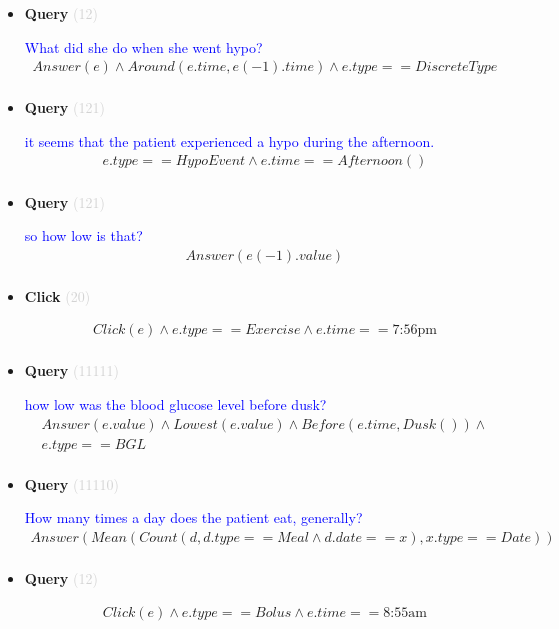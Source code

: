 \documentclass[11pt]{article}
\newcommand{\key}[1]{\textcolor{lightgray}{#1}}
\newcounter{CQuery}
\newcounter{CClick}
\begin{document}
\begin{itemize}
\item
\textbf{Query\theCQuery} \key{(12)} \addtocounter{CQuery}{1}
\textcolor{blue}{ What did she do when she went hypo? }
\begin{multline*}
Answer(e) \wedge Around(e.time, e(-1).time) \wedge e.type==DiscreteType \\ 
\end{multline*}


\item
\textbf{Query\theCQuery} \key{(121)} \addtocounter{CQuery}{1}
\textcolor{blue}{ it seems that the patient experienced a hypo during the afternoon. }
\begin{multline*}
e.type==HypoEvent \wedge e.time==Afternoon() \\ 
\end{multline*}


\item
\textbf{Query\theCQuery} \key{(121)} \addtocounter{CQuery}{1}
\textcolor{blue}{ so how low is that? }
\begin{multline*}
Answer(e(-1).value) \\ 
\end{multline*}


\item
\textbf{Click\theCClick} \key{(20)} \addtocounter{CClick}{1}
\textcolor{blue}{  }
\begin{multline*}
Click(e) \wedge e.type==Exercise \wedge e.time==\mbox{7:56pm} \\ 
\end{multline*}


\item
\textbf{Query\theCQuery} \key{(11111)} \addtocounter{CQuery}{1}
\textcolor{blue}{ how low was the blood glucose level before dusk? }
\begin{multline*}
Answer(e.value) \wedge Lowest(e.value) \wedge Before(e.time, Dusk()) \wedge \\ 
e.type==BGL \\ 
\end{multline*}


\item
\textbf{Query\theCQuery} \key{(11110)} \addtocounter{CQuery}{1}
\textcolor{blue}{ How many times a day does the patient eat, generally? }
\begin{multline*}
Answer(Mean(Count(d, d.type==Meal \wedge d.date==x), x.type==Date)) \\ 
\end{multline*}


\item
\textbf{Query\theCQuery} \key{(12)} \addtocounter{CQuery}{1}
\textcolor{blue}{  }
\begin{multline*}
Click(e) \wedge e.type == Bolus \wedge e.time==\mbox{8:55am} \\ 
\end{multline*}



\end{itemize}
\end{document}
